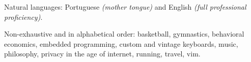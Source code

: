 \documentclass[10pt,a4paper]{article}
\begin{document}
\vspace{0.5em}
\inlineheadsection
  {Natural languages:}
  {Portuguese \emph{(mother tongue)} and English \emph{(full professional proficiency)}.}


\spacedhrule{1.6em}{-0.4em}


\inlineheadsection
  {Non-exhaustive and in alphabetical order:}
  {basketball, gymnastics, behavioral economics, embedded programming, custom
  and vintage keyboards, music, philosophy, privacy in the age of internet,
  running, travel, vim.}
\end{document}
